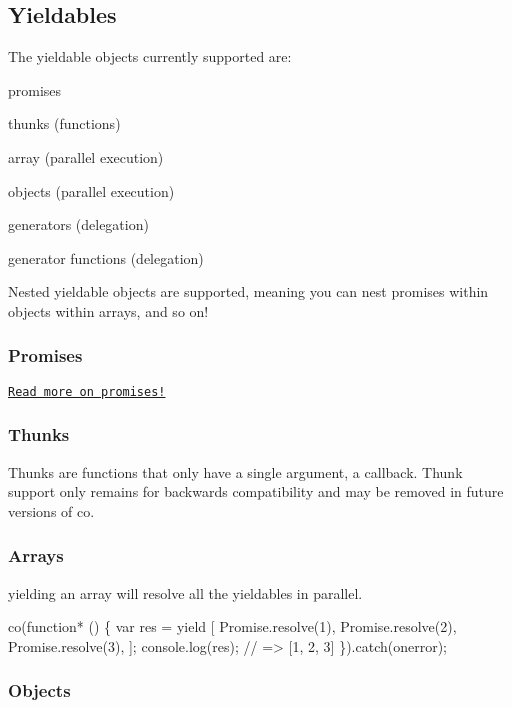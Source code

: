 \subsection*{Yieldables}

The {\ttfamily yieldable} objects currently supported are\+:


\begin{DoxyItemize}
\item promises
\item thunks (functions)
\item array (parallel execution)
\item objects (parallel execution)
\item generators (delegation)
\item generator functions (delegation)
\end{DoxyItemize}

Nested {\ttfamily yieldable} objects are supported, meaning you can nest promises within objects within arrays, and so on!

\subsubsection*{Promises}

\href{https://developer.mozilla.org/en-US/docs/Web/JavaScript/Reference/Global_Objects/Promise}{\tt Read more on promises!}

\subsubsection*{Thunks}

Thunks are functions that only have a single argument, a callback. Thunk support only remains for backwards compatibility and may be removed in future versions of {\ttfamily co}.

\subsubsection*{Arrays}

{\ttfamily yield}ing an array will resolve all the {\ttfamily yieldables} in parallel.


\begin{DoxyCode}
co(function* () \{
  var res = yield [
    Promise.resolve(1),
    Promise.resolve(2),
    Promise.resolve(3),
  ];
  console.log(res); // => [1, 2, 3]
\}).catch(onerror);
\end{DoxyCode}


\subsubsection*{Objects}

